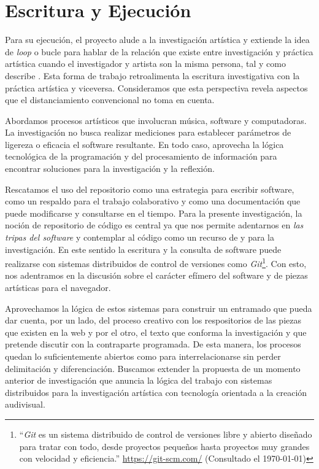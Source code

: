 

\section*{Escritura y Ejecución}

Para su ejecución, el proyecto alude a la investigación artística y extiende la idea de \textit{loop} o bucle para hablar de la relación que existe entre investigación y práctica artística cuando el investigador y artista son la misma persona, tal y como describe \cite{ocelotlMas}. Esta forma de trabajo retroalimenta la escritura investigativa con la práctica artística y viceversa. Consideramos que esta perspectiva revela aspectos que el distanciamiento convencional no toma en cuenta. %

Abordamos procesos artísticos que involucran música, software y computadoras. La investigación no busca realizar mediciones para establecer parámetros de ligereza o eficacia el software resultante. En todo caso, aprovecha la lógica tecnológica de la programación y del procesamiento de información para encontrar soluciones para la investigación y la reflexión.

Rescatamos el uso del repositorio como una estrategia para escribir software, como un respaldo para el trabajo colaborativo y como una documentación que puede modificarse y consultarse en el tiempo. Para la presente investigación, la noción de repositorio de código es central ya que nos permite adentarnos en \textit{las tripas del software} y contemplar al código como un recurso de y para la investigación. En este sentido la escritura y la consulta de software puede realizarse con sistemas distribuidos de control de versiones como \textit{Git}\footnote{``\textit{Git} es un sistema distribuido de control de versiones libre y abierto diseñado para tratar con todo, desde proyectos pequeños hasta proyectos muy grandes con velocidad y eficiencia.'' \url{https://git-scm.com/} (Consultado el \today)}. Con esto, nos adentramos en la discusión sobre el carácter efímero del software y de piezas artísticas para el navegador. 

Aprovechamos la lógica de estos sistemas para construir un entramado que pueda dar cuenta, por un lado, del proceso creativo con los respositorios de las piezas que existen en la web y por el otro, el texto que conforma la investigación y que pretende discutir con la contraparte programada. De esta manera, los procesos quedan lo suficientemente abiertos como para interrelacionarse sin perder delimitación y diferenciación. Buscamos extender la propuesta de un momento anterior de investigación que anuncia la lógica del trabajo con sistemas distribuidos para la investigación artística con tecnología orientada a la creación audivisual.

